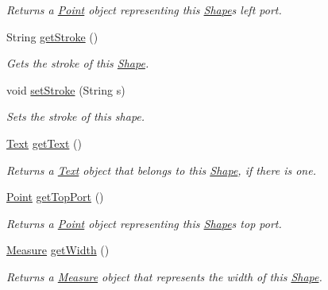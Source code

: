 \begin{DoxyCompactItemize}
\begin{DoxyCompactList}\small\item\em Returns a \hyperlink{classcom_1_1aarrelaakso_1_1drawl_1_1_point}{Point} object representing this \hyperlink{classcom_1_1aarrelaakso_1_1drawl_1_1_shape}{Shape}\textquotesingle{}s left port. \end{DoxyCompactList}\item 
String \hyperlink{classcom_1_1aarrelaakso_1_1drawl_1_1_shape_a4e1d54c7e161e3af5053939ddefdf9e6}{get\+Stroke} ()
\begin{DoxyCompactList}\small\item\em Gets the stroke of this \hyperlink{classcom_1_1aarrelaakso_1_1drawl_1_1_shape}{Shape}. \end{DoxyCompactList}\item 
void \hyperlink{classcom_1_1aarrelaakso_1_1drawl_1_1_shape_a3930f6fe72f6c5e0c0aa4c25ffbf18ff}{set\+Stroke} (String s)
\begin{DoxyCompactList}\small\item\em Sets the stroke of this shape. \end{DoxyCompactList}\item 
\hyperlink{classcom_1_1aarrelaakso_1_1drawl_1_1_text}{Text} \hyperlink{classcom_1_1aarrelaakso_1_1drawl_1_1_shape_a6f876978d4102974fedc5b41c93c7b26}{get\+Text} ()
\begin{DoxyCompactList}\small\item\em Returns a \hyperlink{classcom_1_1aarrelaakso_1_1drawl_1_1_text}{Text} object that belongs to this \hyperlink{classcom_1_1aarrelaakso_1_1drawl_1_1_shape}{Shape}, if there is one. \end{DoxyCompactList}\item 
\hyperlink{classcom_1_1aarrelaakso_1_1drawl_1_1_point}{Point} \hyperlink{classcom_1_1aarrelaakso_1_1drawl_1_1_shape_aed4e9caa294aacc973b7a531a960e9e5}{get\+Top\+Port} ()
\begin{DoxyCompactList}\small\item\em Returns a \hyperlink{classcom_1_1aarrelaakso_1_1drawl_1_1_point}{Point} object representing this \hyperlink{classcom_1_1aarrelaakso_1_1drawl_1_1_shape}{Shape}\textquotesingle{}s top port. \end{DoxyCompactList}\item 
\hyperlink{classcom_1_1aarrelaakso_1_1drawl_1_1_measure}{Measure} \hyperlink{classcom_1_1aarrelaakso_1_1drawl_1_1_shape_a3e2c58984f1bcbc2e9e86cf30868561e}{get\+Width} ()
\begin{DoxyCompactList}\small\item\em Returns a \hyperlink{classcom_1_1aarrelaakso_1_1drawl_1_1_measure}{Measure} object that represents the width of this \hyperlink{classcom_1_1aarrelaakso_1_1drawl_1_1_shape}{Shape}. \end{DoxyCompactList}\item 

\end{DoxyCompactItemize}
